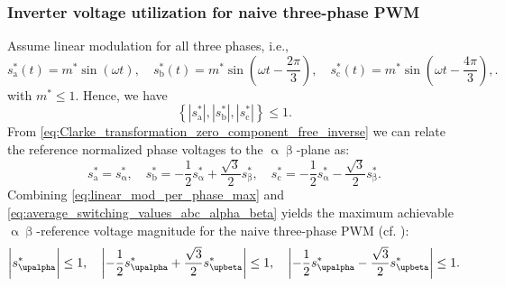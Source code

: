 \begin{frame}
    \frametitle{Inverter voltage utilization for naive three-phase PWM}
    Assume linear modulation for all three phases, i.e.,
    $$s_\mathrm{a}^*(t) = m^* \sin\left(\omega t\right), \quad s_\mathrm{b}^*(t) = m^* \sin\left(\omega t - \frac{2\pi}{3}\right), \quad s_\mathrm{c}^*(t) = m^* \sin\left(\omega t - \frac{4\pi}{3}\right), .$$ with $m^*\leq1$. \pause Hence, we have
    \begin{equation}
        \left\{|s^*_\mathrm{a}|, |s^*_\mathrm{b}|, |s^*_\mathrm{c}|\right\} \leq 1.
        \label{eq:linear_mod_per_phase_max}
    \end{equation}\pause
    From \eqref{eq:Clarke_transformation_zero_component_free_inverse} we can relate the reference normalized phase voltages to the $\upalpha\upbeta$-plane as:
    \begin{equation}
        s^*_\mathrm{a} = s^*_\upalpha, \quad s^*_\mathrm{b} = -\frac{1}{2}s^*_\upalpha + \frac{\sqrt{3}}{2}s^*_\upbeta, \quad s^*_\mathrm{c} = -\frac{1}{2}s^*_\upalpha - \frac{\sqrt{3}}{2}s^*_\upbeta.
        \label{eq:average_switching_values_abc_alpha_beta}
    \end{equation}\pause
    Combining \eqref{eq:linear_mod_per_phase_max} and \eqref{eq:average_switching_values_abc_alpha_beta} yields the maximum achievable $\upalpha\upbeta$-reference voltage magnitude for the naive three-phase PWM (cf. ):
    \begin{equation}
        \left|s^*_\upalpha\vphantom{-\frac{1}{2}s^*_\upalpha + \frac{\sqrt{3}}{2}s^*_\upbeta}\right|\leq 1, \quad \left|-\frac{1}{2}s^*_\upalpha + \frac{\sqrt{3}}{2}s^*_\upbeta\right| \leq 1, \quad \left|-\frac{1}{2}s^*_\upalpha - \frac{\sqrt{3}}{2}s^*_\upbeta\right| \leq 1.
        \label{eq:maximum_achievable_alpha_beta_voltage}
    \end{equation}
\end{frame}

